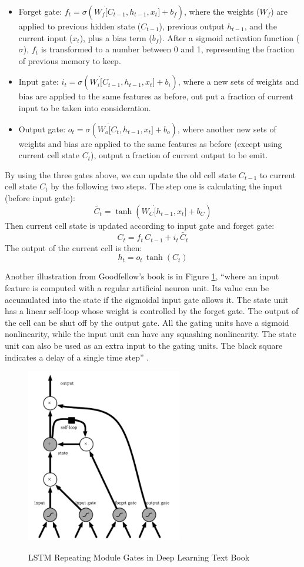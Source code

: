 \documentclass[11pt]{article}
\theoremstyle{plain}
\begin{document}
\begin{itemize}
	\item Forget gate: $f_t=\sigma(W_f\dot [C_{t-1},h_{t-1},x_t]+b_f)$, where 
	the weights ($W_f$) are applied to previous hidden state ($C_{t-1}$), 
	previous output $h_{t-1}$, and the current input ($x_t$), plus a bias term 
	($b_f$). After a sigmoid activation function ($\sigma$), $f_t$ is 
	transformed to a number between 0 and 1, representing the fraction of 
	previous memory to keep. 
	\item Input gate: $i_t=\sigma(W_i\dot [C_{t-1},h_{t-1},x_t]+b_i)$, where a 
	new sets of weights and bias are applied to the same features as before, 
	out put a fraction of current input to be taken into consideration.
	\item Output gate: $o_t=\sigma(W_o\dot [C_{t},h_{t-1},x_t]+b_o)$, where 
	another new sets of weights and bias are applied to the same features as 
	before (except using current cell state $C_t$), output a fraction of current 
	output to be emit. 
\end{itemize}

 By using the three gates above, we can update the old cell state $C_{t-1}$ to 
 current cell state $C_t$ by the following two steps. The step one is 
 calculating the input (before input gate):
 \[
 \tilde{C_t}=\tanh (W_C\dot [h_{t-1},x_t]+b_C)
 \]
 Then current cell state is updated according to input gate and forget gate:
 \[
 C_t=f_t\,C_{t-1}+i_t\,\tilde{C_t}
 \]
The output of the current cell is then:
\[
h_t=o_t\, \tanh(C_t)
\]

Another illustration from Goodfellow's book is in Figure 
\ref{f:lstmgatesgood}, ``where an input feature is computed with a regular 
artiﬁcial neuron unit. Its value can be accumulated into the state if the 
sigmoidal input gate allows it. The state unit has a linear self-loop whose 
weight is controlled by the forget gate. The output of the cell can be shut oﬀ 
by the output gate. All the gating units have a sigmoid nonlinearity, while the 
input unit can have any squashing nonlinearity. The state unit can also be 
used as an extra input to the gating units. The black square indicates a delay 
of a single time step'' \cite{Goodfellow-et-al-2016}.

\begin{figure}[!ht]
	\centering
	\includegraphics[height=3in]{images/lstm-goodfellow.png}
	\caption{LSTM Repeating Module Gates in 
		Deep Learning Text 
		Book}\label{f:lstmgatesgood}\cite{Goodfellow-et-al-2016}
\end{figure}
\end{document}
